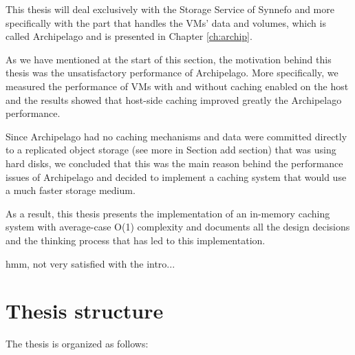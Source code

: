This thesis will deal exclusively with the Storage Service of Synnefo and more 
specifically with the part that handles the VMs' data and volumes, which is 
called Archipelago and is presented in Chapter \ref{ch:archip}.

As we have mentioned at the start of this section, the motivation behind this 
thesis was the unsatisfactory performance of Archipelago. More specifically, we 
measured the performance of VMs with and without caching enabled on the host 
and the results showed that host-side caching improved greatly the Archipelago 
performance.

Since Archipelago had no caching mechanisms and data were committed directly to 
a replicated object storage (see more in Section \fixme add section) that was 
using hard disks, we concluded that this was the main reason behind the 
performance issues of Archipelago and decided to implement a caching system 
that would use a much faster storage medium.

As a result, this thesis presents the implementation of an in-memory caching 
system with average-case O(1) complexity and documents all the design decisions 
and the thinking process that has led to this implementation.

\todo hmm, not very satisfied with the intro...

\section{Thesis structure}

The thesis is organized as follows:

